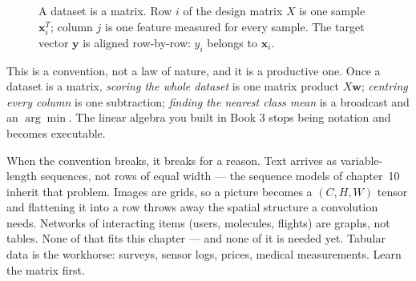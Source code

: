 \begin{figure}[ht]\centering
{}
\caption{A dataset is a matrix. Row $i$ of the design matrix $X$ is one sample
$\mathbf x_i^T$; column $j$ is one feature measured for every sample. The
target vector $\mathbf y$ is aligned row-by-row: $y_i$ belongs to $\mathbf
x_i$.}\label{fig:design-matrix}
\end{figure}

This is a convention, not a law of nature, and it is a productive one. Once a
dataset is a matrix, \emph{scoring the whole dataset} is one matrix product
$X\mathbf w$; \emph{centring every column} is one subtraction; \emph{finding
the nearest class mean} is a broadcast and an $\arg\min$. The linear algebra
you built in Book 3 stops being notation and becomes executable.

When the convention breaks, it breaks for a reason. Text arrives as
variable-length sequences, not rows of equal width --- the sequence models of
chapter~10 inherit that problem. Images are grids, so a picture
becomes a $(C,H,W)$ tensor and flattening it into a row throws away the spatial
structure a convolution needs. Networks of interacting items (users,
molecules, flights) are graphs, not tables. None of that fits this chapter ---
and none of it is needed yet. Tabular data is the workhorse: surveys, sensor
logs, prices, medical measurements. Learn the matrix first.


